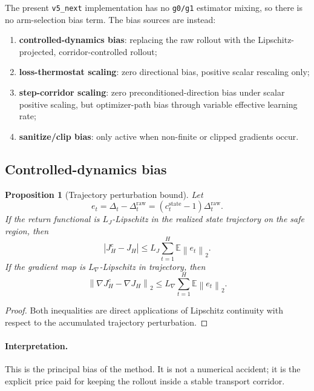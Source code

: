 \documentclass[11pt]{article}
\newtheorem{proposition}{Proposition}
\newcommand{\E}{\mathbb{E}}
\newcommand{\1}{\mathbf{1}}
\newcommand{\norm}[1]{\left\lVert #1 \right\rVert}
\newcommand{\abs}[1]{\left\lvert #1 \right\rvert}
\begin{document}
The present \texttt{v5\_next} implementation has no \texttt{g0/g1} estimator mixing, so there is no arm-selection bias term. The bias sources are instead:
\begin{enumerate}[label=\arabic*.]
  \item \textbf{controlled-dynamics bias}: replacing the raw rollout with the Lipschitz-projected, corridor-controlled rollout;
  \item \textbf{loss-thermostat scaling}: zero directional bias, positive scalar rescaling only;
  \item \textbf{step-corridor scaling}: zero preconditioned-direction bias under scalar positive scaling, but optimizer-path bias through variable effective learning rate;
  \item \textbf{sanitize/clip bias}: only active when non-finite or clipped gradients occur.
\end{enumerate}

\subsection{Controlled-dynamics bias}
\begin{proposition}[Trajectory perturbation bound]
Let
\begin{equation}
  e_t = \Delta_t - \Delta_t^{\mathrm{raw}} = (c_t^{\mathrm{state}} - 1)\Delta_t^{\mathrm{raw}}.
\end{equation}
If the return functional is $L_J$-Lipschitz in the realized state trajectory on the safe region, then
\begin{equation}
  \abs{J_H^c - J_H}
  \le
  L_J \sum_{t=1}^{H} \E \norm{e_t}_2.
\end{equation}
If the gradient map is $L_{\nabla}$-Lipschitz in trajectory, then
\begin{equation}
  \norm{\nabla J_H^c - \nabla J_H}_2
  \le
  L_{\nabla} \sum_{t=1}^{H} \E \norm{e_t}_2.
\end{equation}
\end{proposition}

\begin{proof}
Both inequalities are direct applications of Lipschitz continuity with respect to the accumulated trajectory perturbation.
\end{proof}

\paragraph{Interpretation.}
This is the principal bias of the method. It is not a numerical accident; it is the explicit price paid for keeping the rollout inside a stable transport corridor.
\end{document}
